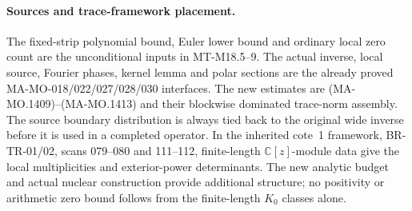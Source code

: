\paragraph{Sources and trace-framework placement.}
The fixed-strip polynomial bound, Euler lower bound and ordinary
local zero count are the unconditional inputs in MT-M18.5--9.
The actual inverse, local source, Fourier phases, kernel lemma and
polar sections are the already proved MA-MO-018/022/027/028/030
interfaces.  The new estimates are (MA-MO.1409)--(MA-MO.1413)
and their blockwise dominated trace-norm assembly.  The source
boundary distribution is always tied back to the original wide
inverse before it is used in a completed operator.
In the inherited cote~1 framework, BR-TR-01/02, scans 079--080
and 111--112, finite-length $\mathbb C[z]$-module data give the
local multiplicities and exterior-power determinants.  The new
analytic budget and actual nuclear construction provide additional
structure; no positivity or arithmetic zero bound follows from
the finite-length $K_0$ classes alone.
